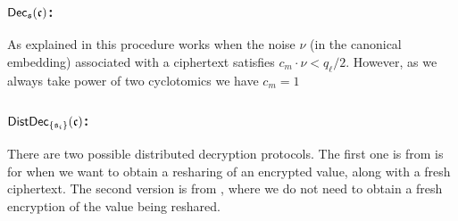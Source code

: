 \subsubsection{$\mathsf{Dec}_{\mathfrak{s}}(\mathfrak{c})$:}
As explained in \cite{SPDZ2,GHS12c} this procedure works when the noise 
$\nu$ (in the canonical embedding) associated with a ciphertext satisfies $c_m \cdot \nu  < q_{\ell}/2$.
However, as we always take power of two cyclotomics we have $c_m=1$

\subsubsection{$\mathsf{DistDec}_{\{\mathfrak{s}_i\}}(\mathfrak{c})$:}
There are two possible distributed decryption protocols.
The first one is from \cite{SPDZ} is for when we want to obtain a
resharing of an encrypted value, along with a fresh ciphertext.
The second version is from \cite{KPR}, where we do not need to
obtain a fresh encryption of the value being reshared.


